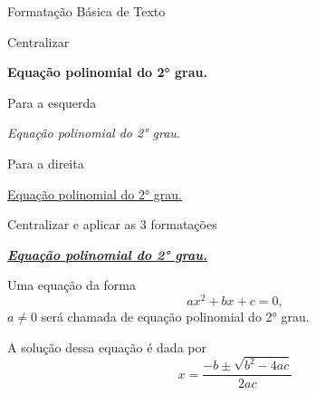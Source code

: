 \documentclass[a4paper, 12pt]{article}
\begin{document}
Formatação Básica de Texto
    \begin{center}
    Centralizar

    \textbf{Equação polinomial do 2° grau.}

    \end{center}

    \begin{flushright}
    Para a esquerda
        
    \textit{Equação polinomial do 2° grau.}
    \end{flushright}

    \begin{flushleft}
    Para a direita
        
    \underline{Equação polinomial do 2° grau.}
    \end{flushleft}

    \begin{center}
    Centralizar e aplicar as 3 formatações
        
    \textbf{\textit{\underline{Equação polinomial do 2° grau.}}}
        
    \end{center}

Uma equação da forma $$ax^2 + bx + c = 0,$$ $a \neq 0$ será chamada de equação
polinomial do 2° grau.

A solução dessa equação é dada por
$$x = \frac{-b \pm \sqrt{b^2 - 4ac}}{2ac} $$
\end{document}
